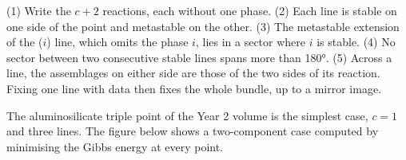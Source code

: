 \begin{method}\label{met:b3:petrological-thermodynamics:schreinemakers}
(1) Write the $c + 2$ reactions, each without one phase. (2) Each line is
stable on one side of the point and metastable on the other. (3) The
metastable extension of the ($i$) line, which omits the phase $i$, lies in a
sector where $i$ is stable. (4) No sector between two consecutive stable lines
spans more than \ang{180}. (5) Across a line, the assemblages on either side
are those of the two sides of its reaction. Fixing one line with data then
fixes the whole bundle, up to a mirror image.
\end{method}

The aluminosilicate triple point of the Year 2 volume is the simplest case,
$c = 1$ and three lines. The figure below shows a two-component case
computed by minimising the Gibbs energy at every point.

